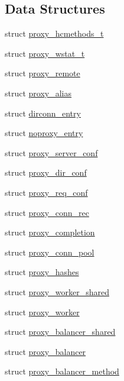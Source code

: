 \subsection*{Data Structures}
\begin{DoxyCompactItemize}
\item 
struct \hyperlink{structproxy__hcmethods__t}{proxy\+\_\+hcmethods\+\_\+t}
\item 
struct \hyperlink{structproxy__wstat__t}{proxy\+\_\+wstat\+\_\+t}
\item 
struct \hyperlink{structproxy__remote}{proxy\+\_\+remote}
\item 
struct \hyperlink{structproxy__alias}{proxy\+\_\+alias}
\item 
struct \hyperlink{structdirconn__entry}{dirconn\+\_\+entry}
\item 
struct \hyperlink{structnoproxy__entry}{noproxy\+\_\+entry}
\item 
struct \hyperlink{structproxy__server__conf}{proxy\+\_\+server\+\_\+conf}
\item 
struct \hyperlink{structproxy__dir__conf}{proxy\+\_\+dir\+\_\+conf}
\item 
struct \hyperlink{structproxy__req__conf}{proxy\+\_\+req\+\_\+conf}
\item 
struct \hyperlink{structproxy__conn__rec}{proxy\+\_\+conn\+\_\+rec}
\item 
struct \hyperlink{structproxy__completion}{proxy\+\_\+completion}
\item 
struct \hyperlink{structproxy__conn__pool}{proxy\+\_\+conn\+\_\+pool}
\item 
struct \hyperlink{structproxy__hashes}{proxy\+\_\+hashes}
\item 
struct \hyperlink{structproxy__worker__shared}{proxy\+\_\+worker\+\_\+shared}
\item 
struct \hyperlink{structproxy__worker}{proxy\+\_\+worker}
\item 
struct \hyperlink{structproxy__balancer__shared}{proxy\+\_\+balancer\+\_\+shared}
\item 
struct \hyperlink{structproxy__balancer}{proxy\+\_\+balancer}
\item 
struct \hyperlink{structproxy__balancer__method}{proxy\+\_\+balancer\+\_\+method}
\end{DoxyCompactItemize}
